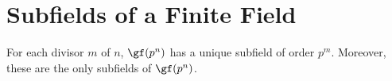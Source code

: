 \section{Subfields of a Finite Field}

\begin{theorem}
	For each divisor $m$ of $n$, $\gf(p^n)$ has a unique subfield of order $p^m$. Moreover, these are the only subfields of $\gf(p^n)$.
\end{theorem}
